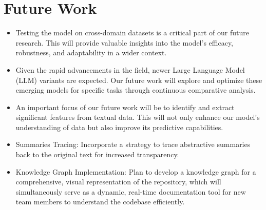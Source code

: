 \section{Future Work}

\begin{itemize}
    \item Testing the model on cross-domain datasets is a critical part of our future research. This will provide valuable insights into the model's efficacy, robustness, and adaptability in a wider context.
    \item Given the rapid advancements in the field, newer Large Language Model (LLM) variants are expected. Our future work will explore and optimize these emerging models for specific tasks through continuous comparative analysis.
    \item An important focus of our future work will be to identify and extract significant features from textual data. This will not only enhance our model's understanding of data but also improve its predictive capabilities.
    \item Summaries Tracing: Incorporate a strategy to trace abstractive summaries back to the original text for increased transparency.
    \item Knowledge Graph Implementation: Plan to develop a knowledge graph for a comprehensive, visual representation of the repository, which will simultaneously serve as a dynamic, real-time documentation tool for new team members to understand the codebase efficiently.
\end{itemize}











